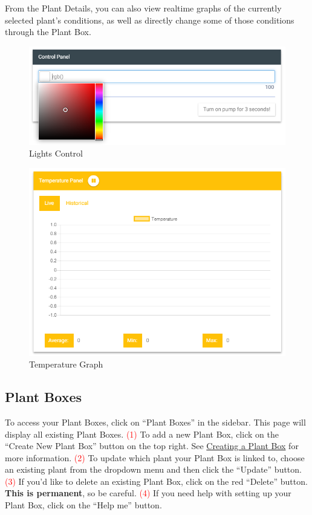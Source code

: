 \documentclass{article}
\begin{document}
	From the Plant Details, you can also view realtime graphs of the currently selected plant's conditions, as well as directly change some of those conditions through the Plant Box.
	
	\begin{figure}[H]
		\includegraphics[width=\textwidth]{../images/UserManual/lights.png}
		\caption{Lights Control}
	\end{figure}	
	
	\begin{figure}[H]
		\includegraphics[width=\textwidth]{../images/UserManual/temperature.png}
		\caption{Temperature Graph}
	\end{figure}
	
\cleardoublepage

	\subsection{Plant Boxes}
	To access your Plant Boxes, click on ``Plant Boxes'' in the sidebar. This page will display all existing Plant Boxes.
	\newline
	\textcolor{red}{(1)} To add a new Plant Box, click on the ``Create New Plant Box'' button on the top right. See \hyperref[sec:creating-a-plant-box]{Creating a Plant Box} for more information.
	\newline
	\textcolor{red}{(2)} To update which plant your Plant Box is linked to, choose an existing plant from the dropdown menu and then click the ``Update'' button.
	\newline
	\textcolor{red}{(3)} If you'd like to delete an existing Plant Box, click on the red ``Delete'' button. \textbf{This is permanent}, so be careful.  
	\newline
	\textcolor{red}{(4)} If you need help with setting up your Plant Box, click on the ``Help me'' button.	
	
\end{document}
